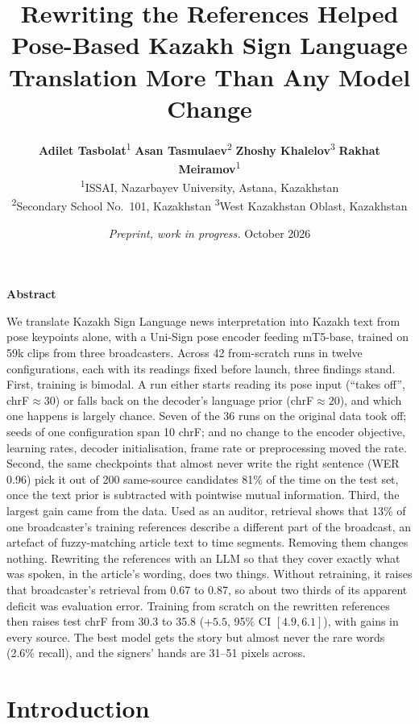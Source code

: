 \documentclass[11pt,twocolumn,a4paper]{article}
\title{\vspace{-1.2cm}\bfseries\Large Rewriting the References Helped Pose-Based Kazakh Sign Language\\ Translation More Than Any Model Change}
\author{\textbf{Adilet Tasbolat}\textsuperscript{1} \quad \textbf{Asan Tasmulaev}\textsuperscript{2} \quad \textbf{Zhoshy Khalelov}\textsuperscript{3} \quad \textbf{Rakhat Meiramov}\textsuperscript{1}\\[2pt]
\textsuperscript{1}ISSAI, Nazarbayev University, Astana, Kazakhstan\\
\textsuperscript{2}Secondary School No.~101, Kazakhstan \quad \textsuperscript{3}West Kazakhstan Oblast, Kazakhstan}
\date{\small\textit{Preprint, work in progress.} October 2026}
\begin{document}
\twocolumn[
\maketitle
\vspace{0.6cm}
]

\begin{center}\textbf{Abstract}\end{center}
\vspace{-0.2cm}
{\small\leftskip=0.6cm\rightskip=0.6cm\noindent
We translate Kazakh Sign Language news interpretation into Kazakh text from pose keypoints alone, with a Uni-Sign pose encoder feeding mT5-base, trained on 59k clips from three broadcasters. Across 42 from-scratch runs in twelve configurations, each with its readings fixed before launch, three findings stand. First, training is bimodal. A run either starts reading its pose input (``takes off'', chrF${\approx}30$) or falls back on the decoder's language prior (chrF${\approx}20$), and which one happens is largely chance. Seven of the 36 runs on the original data took off; seeds of one configuration span 10 chrF; and no change to the encoder objective, learning rates, decoder initialisation, frame rate or preprocessing moved the rate. Second, the same checkpoints that almost never write the right sentence (WER 0.96) pick it out of 200 same-source candidates 81\% of the time on the test set, once the text prior is subtracted with pointwise mutual information. Third, the largest gain came from the data. Used as an auditor, retrieval shows that 13\% of one broadcaster's training references describe a different part of the broadcast, an artefact of fuzzy-matching article text to time segments. Removing them changes nothing. Rewriting the references with an LLM so that they cover exactly what was spoken, in the article's wording, does two things. Without retraining, it raises that broadcaster's retrieval from 0.67 to 0.87, so about two thirds of its apparent deficit was evaluation error. Training from scratch on the rewritten references then raises test chrF from 30.3 to 35.8 ($+5.5$, 95\% CI $[4.9, 6.1]$), with gains in every source. The best model gets the story but almost never the rare words (2.6\% recall), and the signers' hands are 31--51 pixels across.
\par}

\section{Introduction}
\end{document}
